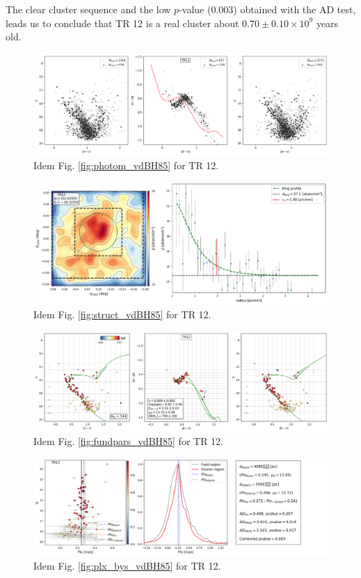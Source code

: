 \documentclass[draft]{aa}
\begin{document}
The clear cluster sequence and the low $p$-value (0.003) obtained with the AD
test, leads us to conclude that TR 12 is a real cluster about
$0.70\pm0.10\times10^9$ years old.

\begin{figure}[ht]
    \centering
    \includegraphics[width=\hsize]{../figs/obs_TR12.png}
    \caption{Idem Fig. \ref{fig:photom_vdBH85} for TR 12.}
    \label{fig19}
\end{figure}
\begin{figure}[ht]
    \centering
    \includegraphics[width=\hsize]{../figs/dmap_trumpler12.png}
    \caption{Idem Fig. \ref{fig:struct_vdBH85} for TR 12.}
    \label{fig20}
\end{figure}
\begin{figure}[ht]
    \centering
    \includegraphics[width=\hsize]{../figs/cmds_tr12.png}
    \caption{Idem Fig. \ref{fig:fundpars_vdBH85} for TR 12.}
    \label{fig21}
\end{figure}
\begin{figure}[ht]
    \centering
    \includegraphics[width=\hsize]{../figs/plx_TR12.png}
    \caption{Idem Fig. \ref{fig:plx_bys_vdBH85} for TR 12.}
    \label{fig22}
\end{figure}
\end{document}

